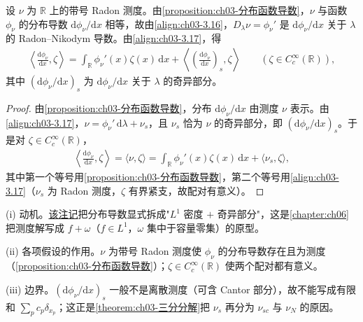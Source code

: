 \documentclass[../../main.tex]{subfiles}%
\begin{document}
\begin{remark}\label{remark:ch03-分布导数分解}
设 $\nu$ 为 $\mathbb{R}$ 上的带号 Radon 测度。由\cref{proposition:ch03-分布函数导数}，$\nu$ 与函数 $\phi_\nu$ 的分布导数 $\mathrm{d}\phi_\nu/\mathrm{d}x$ 相等，故由\eqref{align:ch03-3.16}，$D_\lambda\nu=\phi_\nu'$ 是 $\mathrm{d}\phi_\nu/\mathrm{d}x$ 关于 $\lambda$ 的 Radon--Nikodym 导数。由\eqref{align:ch03-3.17}，得
\begin{align*}
\left\langle\frac{\mathrm{d}\phi_\nu}{\mathrm{d}x},\zeta\right\rangle
=\int_{\mathbb{R}}\phi_\nu'(x)\zeta(x)\,\mathrm{d}x
+\left\langle\left(\frac{\mathrm{d}\phi_\nu}{\mathrm{d}x}\right)_s,\zeta\right\rangle
\qquad(\zeta\in C^\infty_c(\mathbb{R})),
\end{align*}
其中 $(\mathrm{d}\phi_\nu/\mathrm{d}x)_s$ 为 $\mathrm{d}\phi_\nu/\mathrm{d}x$ 关于 $\lambda$ 的奇异部分。
\end{remark}

\begin{proof}
由\cref{proposition:ch03-分布函数导数}，分布 $\mathrm{d}\phi_\nu/\mathrm{d}x$ 由测度 $\nu$ 表示。由\eqref{align:ch03-3.17}，$\nu=\phi_\nu'\,\mathrm{d}\lambda+\nu_s$，且 $\nu_s$ 恰为 $\nu$ 的奇异部分，即 $(\mathrm{d}\phi_\nu/\mathrm{d}x)_s$。于是对 $\zeta\in C^\infty_c(\mathbb{R})$，
\begin{align*}
\left\langle\frac{\mathrm{d}\phi_\nu}{\mathrm{d}x},\zeta\right\rangle=\langle\nu,\zeta\rangle=\int_{\mathbb{R}}\phi_\nu'(x)\zeta(x)\,\mathrm{d}x+\langle\nu_s,\zeta\rangle,
\end{align*}
其中第一个等号用\cref{proposition:ch03-分布函数导数}，第二个等号用\eqref{align:ch03-3.17}（$\nu_s$ 为 Radon 测度，$\zeta$ 有界紧支，故配对有意义）。
\end{proof}

\begin{remark}\label{remark:ch03-分布导数分解动机}
(i) 动机。\hyperref[remark:ch03-分布导数分解]{该注记}把分布导数显式拆成"$L^1$ 密度 $+$ 奇异部分"，这是\cref{chapter:ch06}把测度解写成 $f+\omega$（$f\in L^1$，$\omega$ 集中于容量零集）的原型。

(ii) 各项假设的作用。$\nu$ 为带号 Radon 测度使 $\phi_\nu$ 的分布导数存在且为测度（\cref{proposition:ch03-分布函数导数}）；$\zeta\in C^\infty_c(\mathbb{R})$ 使两个配对都有意义。

(iii) 边界。$(\mathrm{d}\phi_\nu/\mathrm{d}x)_s$ 一般不是离散测度（可含 Cantor 部分），故不能写成有限和 $\sum_pc_p\delta_{x_p}$；这正是\cref{theorem:ch03-三分分解}把 $\nu_s$ 再分为 $\nu_{sc}$ 与 $\nu_N$ 的原因。
\end{remark}
\end{document}
